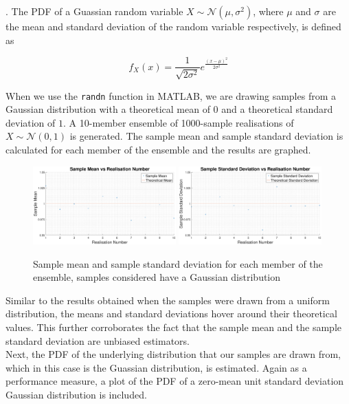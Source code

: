 \documentclass{article}
\begin{document}
. The PDF of a Guassian random variable $X\sim \mathcal{N}(\mu,\sigma^{2})$, where $\mu$ and $\sigma$ are the mean and standard deviation of the random variable respectively, is defined as

\begin{equation}
    f_{X}(x) = \frac{1}{\sqrt{2\sigma^{2}}}e^{\frac{(x-\mu)^{2}}{2\sigma^{2}}}
\end{equation}

When we use the {\tt randn} function in MATLAB, we are drawing samples from a Gaussian distribution with a theoretical mean of $0$ and a theoretical standard deviation of $1$. A 10-member ensemble of 1000-sample realisations of $X\sim \mathcal{N}(0,1)$ is generated. The sample mean and sample standard deviation is calculated for each member of the ensemble and the results are graphed. 

\begin{figure}[H]
\includegraphics[width=0.49\textwidth]{sample_mean_vs_realisation_number_randn}
\includegraphics[width=0.49\textwidth]{sample_standard_deviation_vs_realisation_number_randn}
\caption{Sample mean and sample standard deviation for each member of the ensemble, samples considered have a Gaussian distribution}
\end{figure}

Similar to the results obtained when the samples were drawn from a uniform distribution, the means and standard deviations hover around their theoretical values. This further corroborates the fact that the sample mean and the sample standard deviation are unbiased estimators.\\

Next, the PDF of the underlying distribution that our samples are drawn from, which in this case is the Guassian distribution, is estimated. Again as a performance measure, a plot of the PDF of a zero-mean unit standard deviation Gaussian distribution is included.
\end{document}
